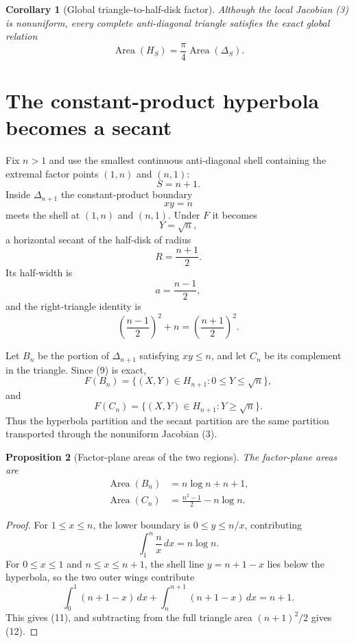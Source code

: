 \documentclass[11pt]{amsart}
\newtheorem{proposition}{Proposition}
\newtheorem{corollary}[proposition]{Corollary}
\theoremstyle{remark}
\begin{document}
\begin{corollary}[Global triangle-to-half-disk factor]\label{cor:pifour}
Although the local Jacobian (3) is nonuniform, every complete anti-diagonal triangle satisfies the exact global relation
\begin{equation}
\boxed{
\operatorname{Area}(H_S)=\frac\pi4\operatorname{Area}(\Delta_S).}
\tag{8}
\end{equation}
\end{corollary}

\section{The constant-product hyperbola becomes a secant}
Fix $n>1$ and use the smallest continuous anti-diagonal shell containing the extremal factor points $(1,n)$ and $(n,1)$:
\[
S=n+1.
\]
Inside $\Delta_{n+1}$ the constant-product boundary
\[
xy=n
\]
meets the shell at $(1,n)$ and $(n,1)$.  Under $F$ it becomes
\begin{equation}
\boxed{Y=\sqrt n,}\tag{9}
\end{equation}
a horizontal secant of the half-disk of radius
\[
R=\frac{n+1}{2}.
\]
Its half-width is
\[
a=\frac{n-1}{2},
\]
and the right-triangle identity is
\begin{equation}
\boxed{
\left(\frac{n-1}{2}\right)^2+n
=\left(\frac{n+1}{2}\right)^2.}
\tag{10}
\end{equation}

Let $B_n$ be the portion of $\Delta_{n+1}$ satisfying $xy\le n$, and let $C_n$ be its complement in the triangle.  Since (9) is exact,
\[
F(B_n)=\{(X,Y)\in H_{n+1}:0\le Y\le\sqrt n\},
\]
and
\[
F(C_n)=\{(X,Y)\in H_{n+1}:Y\ge\sqrt n\}.
\]
Thus the hyperbola partition and the secant partition are the same partition transported through the nonuniform Jacobian (3).

\begin{proposition}[Factor-plane areas of the two regions]\label{prop:factorpartition}
The factor-plane areas are
\begin{align}
\operatorname{Area}(B_n)
&=n\log n+n+1, \tag{11}\\
\operatorname{Area}(C_n)
&=\frac{n^2-1}{2}-n\log n. \tag{12}
\end{align}
\end{proposition}

\begin{proof}
For $1\le x\le n$, the lower boundary is $0\le y\le n/x$, contributing
\[
\int_1^n\frac n x\,dx=n\log n.
\]
For $0\le x\le1$ and $n\le x\le n+1$, the shell line $y=n+1-x$ lies below the hyperbola, so the two outer wings contribute
\[
\int_0^1(n+1-x)\,dx+\int_n^{n+1}(n+1-x)\,dx=n+1.
\]
This gives (11), and subtracting from the full triangle area $(n+1)^2/2$ gives (12).
\end{proof}
\end{document}
